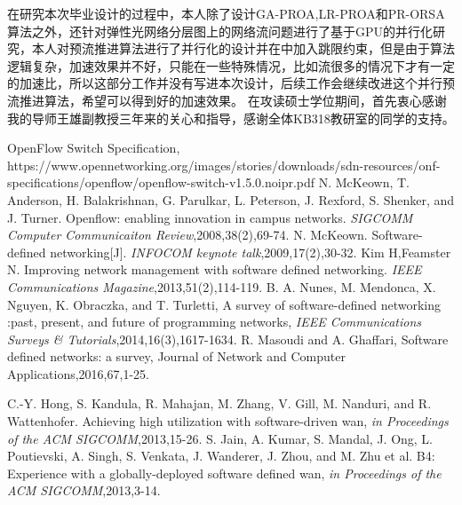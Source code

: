 \documentclass[master]{thesis-uestc}
\begin{document}
在研究本次毕业设计的过程中，本人除了设计GA-PROA,LR-PROA和PR-ORSA算法之外，还针对弹性光网络分层图上的网络流问题进行了基于GPU的并行化研究，本人对预流推进算法进行了并行化的设计并在中加入跳限约束，但是由于算法逻辑复杂，加速效果并不好，只能在一些特殊情况，比如流很多的情况下才有一定的加速比，所以这部分工作并没有写进本次设计，后续工作会继续改进这个并行预流推进算法，希望可以得到好的加速效果。
\thesisacknowledgement
在攻读硕士学位期间，首先衷心感谢我的导师王雄副教授三年来的关心和指导，感谢全体KB318教研室的同学的支持。



\begin{thebibliography}{1}
OpenFlow Switch Specification, https://www.opennetworking.org/images\newline/stories/downloads/sdn-resources/onf-specifications/openflow/openflow-switch-v1.5.0.noipr.pdf
N. McKeown, T. Anderson, H. Balakrishnan, G. Parulkar, L. Peterson, J. Rexford, S. Shenker, and J. Turner. Openflow: enabling innovation in campus networks. \emph{SIGCOMM Computer Communicaiton Review},2008,38(2),69-74.
N. McKeown. Software-defined networking[J]. \emph{INFOCOM keynote talk},2009,17(2),30-32.
Kim H,Feamster N. Improving network management with software defined networking. \emph{IEEE Communications Magazine},2013,51(2),114-119.
B. A. Nunes, M. Mendonca, X. Nguyen, K. Obraczka, and T. Turletti, A survey of software-defined networking :past, present, and future of programming networks, \emph{IEEE Communications Surveys \& Tutorials},2014,16(3),1617-1634.
R. Masoudi and A. Ghaffari, Software defined networks: a survey, Journal of Network and Computer Applications,2016,67,1-25.


C.-Y. Hong, S. Kandula, R. Mahajan, M. Zhang, V. Gill, M. Nanduri, and R. Wattenhofer. Achieving high utilization with software-driven wan, \emph{in Proceedings of the ACM SIGCOMM},2013,15-26.
S. Jain, A. Kumar, S. Mandal, J. Ong, L. Poutievski, A. Singh, S. Venkata, J. Wanderer, J. Zhou, and M. Zhu et al. B4: Experience with a globally-deployed software defined wan, \emph{in Proceedings of the ACM SIGCOMM},2013,3-14.


\end{thebibliography}
\end{document}
